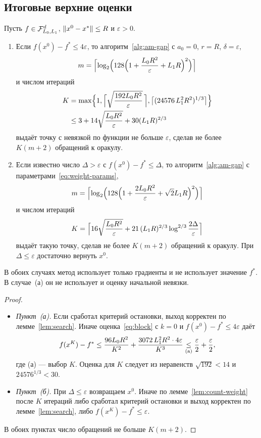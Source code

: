 \subsection{Итоговые верхние оценки}\label{sec:gap-upper}

\begin{theorem}\label{thm:upper-gap}
Пусть $f\in\mathcal F_{L_0,L_1}^d$, $\|x^0-x^\ast\|\le R$ и $\varepsilon>0$.
\begin{enumerate}
\item[(а)] Если $f(x^0)-f^\ast\le4\varepsilon$, то алгоритм~\ref{alg:am-gap} с $a_0=0$, $r=R$, $\delta=\varepsilon$,
\[
 m=\Bigl\lceil\log_2\Bigl(128\Bigl(1+\frac{L_0R^2}\varepsilon+L_1R\Bigr)^2\Bigr)\Bigr\rceil
\]
и числом итераций
\begin{align*}
 K&=\max\Bigl\{1,\Bigl\lceil\sqrt{\frac{192L_0R^2}\varepsilon}\,\Bigr\rceil,\bigl\lceil(24576\,L_1^2R^2)^{1/3}\bigr\rceil\Bigr\}\\
 &\le3+14\sqrt{\frac{L_0R^2}\varepsilon}+30(L_1R)^{2/3}
\end{align*}
выдаёт точку с невязкой по функции не больше $\varepsilon$, сделав не более $K(m+2)$ обращений к оракулу.
\item[(б)] Если известно число $\Delta>\varepsilon$ с $f(x^0)-f^\ast\le\Delta$, то алгоритм~\ref{alg:am-gap} с параметрами~\eqref{eq:weight-params},
\[
 m=\Bigl\lceil\log_2\Bigl(128\Bigl(1+\frac{2L_0R^2}\varepsilon+\sqrt2L_1R\Bigr)^2\Bigr)\Bigr\rceil
\]
и числом итераций
\[
 K=\Bigl\lceil16\sqrt{\frac{L_0R^2}\varepsilon}+21\,(L_1R)^{2/3}\log^{2/3}\frac{2\Delta}\varepsilon\Bigr\rceil
\]
выдаёт такую точку, сделав не более $K(m+2)$ обращений к оракулу. При $\Delta\le\varepsilon$ достаточно вернуть $x^0$.
\end{enumerate}
В обоих случаях метод использует только градиенты и не использует значение $f^\ast$. В случае~(а) он не использует и оценку начальной невязки.
\end{theorem}

\begin{proof}
\leavevmode
\begin{itemize}
\item \emph{Пункт~(а).} Если сработал критерий остановки, выход корректен по лемме~\ref{lem:search}. Иначе оценка~\eqref{eq:block} с $k=0$ и $f(x^0)-f^\ast\le4\varepsilon$ даёт
\[
 f(x^K)-f^\ast\le\frac{96L_0R^2}{K^2}+\frac{3072\,L_1^2R^2\cdot4\varepsilon}{K^3}\mathrel{\underset{(\mathrm a)}{\le}}\frac\varepsilon2+\frac\varepsilon2 ,
\]
где (а) --- выбор $K$. Оценка для $K$ следует из неравенств $\sqrt{192}<14$ и $24576^{1/3}<30$.
\item \emph{Пункт~(б).} При $\Delta\le\varepsilon$ возвращаем $x^0$. Иначе по лемме~\ref{lem:count-weight} после $K$ итераций либо сработал критерий остановки и выход корректен по лемме~\ref{lem:search}, либо $f(x^K)-f^\ast\le\varepsilon$.
\end{itemize}
В обоих пунктах число обращений не больше $K(m+2)$.
\end{proof}

